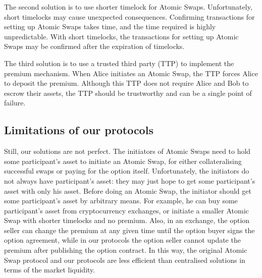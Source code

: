 The second solution is to use shorter timelock for Atomic Swaps.
Unfortunately, short timelocks may cause unexpected consequences.
Confirming transactions for setting up Atomic Swaps takes time, and the time required is highly unpredictable.
With short timelocks, the transactions for setting up Atomic Swaps may be confirmed after the expiration of timelocks.

The third solution is to use a trusted third party (TTP) to implement the premium mechanism.
When Alice initiates an Atomic Swap, the TTP forces Alice to deposit the premium.
Although this TTP does not require Alice and Bob to escrow their assets, the TTP should be trustworthy and can be a single point of failure.

\subsection{Limitations of our protocols}

Still, our solutions are not perfect.
The initiators of Atomic Swaps need to hold some participant's asset to initiate an Atomic Swap,
for either collateralising successful swaps or paying for the option itself.
Unfortunately, the initiators do not always have participant's asset: they may just hope to get some participant's asset with only his asset.
Before doing an Atomic Swap, the initiator should get some participant's asset by arbitrary means.
For example, he can buy some participant's asset from cryptocurrency exchanges, or initiate a smaller Atomic Swap with shorter timelocks and no premium.
Also, in an exchange, the option seller can change the premium at any given time until the option buyer signs the option agreement, while in our protocols the option seller cannot update the premium after publishing the option contract.
In this way, the original Atomic Swap protocol and our protocols are less efficient than centralised solutions in terms of the market liquidity.